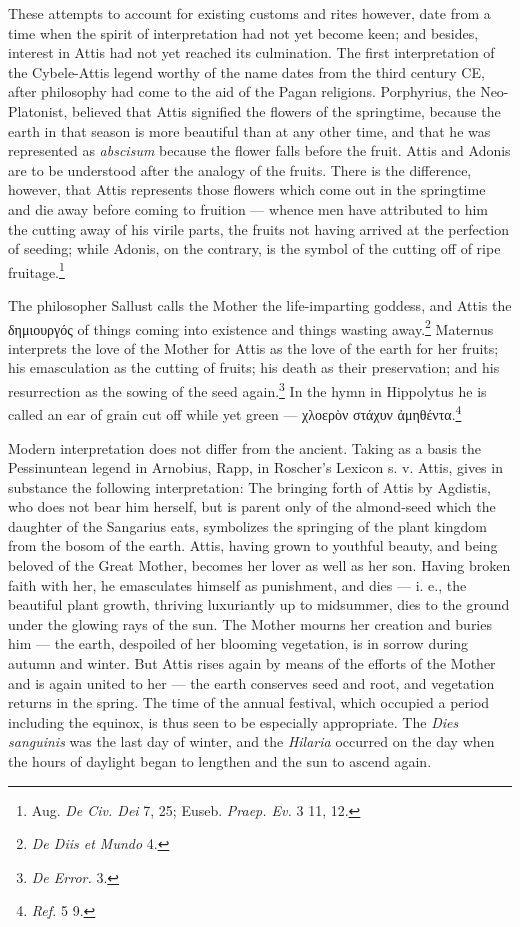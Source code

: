 \documentclass[a4paper, 11pt, oneside, polutonikogreek, french]{article}
\begin{document}
These attempts to account for existing customs and rites however, date from a time when the spirit of interpretation had not yet become keen; and besides, interest in Attis had not yet reached its culmination. The first interpretation of the Cybele-Attis legend worthy of the name dates from the third century \textsc{CE}, after philosophy had come to the aid of the Pagan religions. Porphyrius, the Neo-Platonist, believed that Attis signified the flowers of the springtime, because the earth in that season is more beautiful than at any other time, and that he was represented as \emph{abscisum} because the flower falls before the fruit. Attis and Adonis are to be understood after the analogy of the fruits. There is the difference, however, that Attis represents those flowers which come out in the springtime and die away before coming to fruition --- whence men have attributed to him the cutting away of his virile parts, the fruits not having arrived at the perfection of seeding; while Adonis, on the contrary, is the symbol of the cutting off of ripe fruitage.\footnote{Aug. \emph{De Civ. Dei} 7, 25; Euseb. \emph{Praep. Ev.} 3 11, 12.}

The philosopher Sallust calls the Mother the life-imparting goddess, and Attis the δημιουργός of things coming into existence and things wasting away.\footnote{\emph{De Diis et Mundo} 4.} Maternus interprets the love of the Mother for Attis as the love of the earth for her fruits; his emasculation as the cutting of fruits; his death as their preservation; and his resurrection as the sowing of the seed again.\footnote{\emph{De Error.} 3.} In the hymn in Hippolytus he is called an ear of grain cut off while yet green --- χλοερὸν στάχυν ἀμηθέντα.\footnote{\emph{Ref.} 5 9.}

Modern interpretation does not differ from the ancient. Taking as a basis the Pessinuntean legend in Arnobius, Rapp, in Roscher's Lexicon s. v. Attis, gives in substance the following interpretation: The bringing forth of Attis by Agdistis, who does not bear him herself, but is parent only of the almond-seed which the daughter of the Sangarius eats, symbolizes the springing of the plant kingdom from the bosom of the earth. Attis, having grown to youthful beauty, and being beloved of the Great Mother, becomes her lover as well as her son. Having broken faith with her, he emasculates himself as punishment, and dies --- i. e., the beautiful plant growth, thriving luxuriantly up to midsummer, dies to the ground under the glowing rays of the sun. The Mother mourns her creation and buries him --- the earth, despoiled of her blooming vegetation, is in sorrow during autumn and winter. But Attis rises again by means of the efforts of the Mother and is again united to her --- the earth conserves seed and root, and vegetation returns in the spring. The time of the annual festival, which occupied a period including the equinox, is thus seen to be especially appropriate. The \emph{Dies sanguinis} was the last day of winter, and the \emph{Hilaria} occurred on the day when the hours of daylight began to lengthen and the sun to ascend again.
\end{document}
